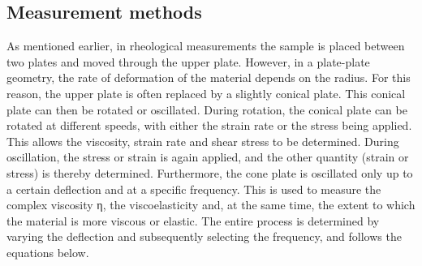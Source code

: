 \documentclass[10pt,a4paper,ngerman]{scrartcl}
\begin{document}
	\subsection{Measurement methods}
		As mentioned earlier, in rheological measurements the sample is placed between two plates and moved through the upper plate. However, in a plate-plate 
		geometry, the rate of deformation of the material depends on the radius. For this reason, the upper plate is often replaced by a slightly conical plate. This 
		conical plate can then be rotated or oscillated. During rotation, the conical plate can be rotated at different speeds, with either the strain rate or the 
		stress being applied. This allows the viscosity, strain rate and shear stress to be determined. During oscillation, the stress or strain is again applied, and the 
		other quantity (strain or stress) is thereby determined. Furthermore, the cone plate is oscillated only up to a certain deflection and at a specific frequency. This is used to 
		measure the complex viscosity η, the viscoelasticity and, at the same time, the extent to which the material is more viscous or elastic. The entire process is 
		determined by varying the deflection and subsequently selecting the frequency, and follows the equations below.\\
	
\end{document}
